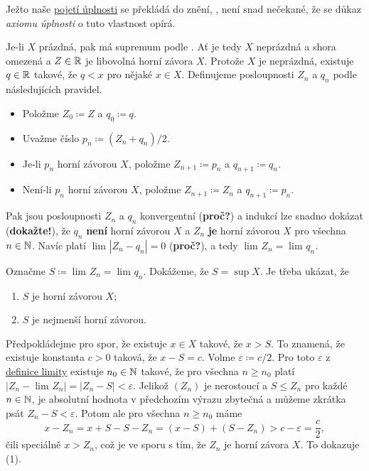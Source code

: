 \begin{propproof}
 Ježto naše \hyperref[cor:r-jsou-uplna]{pojetí úplnosti} se překládá do znění,
 , není snad nečekané, že se důkaz
 \emph{axiomu úplnosti} o tuto vlastnost opírá.

 Je-li $X$ prázdná, pak má supremum podle
 . Ať je tedy $X$ neprázdná a shora
 omezená a $Z \in \mathbb{R}$ je libovolná horní závora $X$. Protože $X$ je neprázdná,
 existuje $q \in \mathbb{R}$ takové, že $q < x$ pro nějaké $x \in X$. Definujeme
 posloupnosti $Z_n$ a $q_n$ podle následujících pravidel.
 \begin{itemize}
  \item Položme $Z_0 \coloneqq Z$ a $q_0 \coloneqq q$.
  \item Uvažme číslo $p_n \coloneqq (Z_n + q_n) / 2$.
  \item Je-li $p_n$ horní závorou $X$, položme $Z_{n+1} \coloneqq p_n$ a
   $q_{n+1} \coloneqq q_n$.
  \item Není-li $p_n$ horní závorou $X$, položme $Z_{n+1} \coloneqq Z_n$ a
   $q_{n+1} \coloneqq p_n$.
 \end{itemize}
 Pak jsou posloupnosti $Z_n$ a $q_n$ konvergentní (\textbf{proč?}) a indukcí lze
 snadno dokázat (\textbf{dokažte!}), že $q_n$ \textbf{není} horní závorou $X$ a
 $Z_n$ \textbf{je} horní závorou $X$ pro všechna $n \in \mathbb{N}$. Navíc platí
 $\lim_{} |Z_n - q_n| = 0$ (\textbf{proč?}), a tedy $\lim_{} Z_n = \lim_{} q_n$.

 Označme $S \coloneqq \lim_{} Z_n = \lim_{} q_n$. Dokážeme, že $S = \sup X$. Je
 třeba ukázat, že
 \begin{enumerate}
  \item $S$ je horní závorou $X$;
  \item $S$ je nejmenší horní závorou.
 \end{enumerate}
 Předpokládejme pro spor, že existuje $x \in X$ takové, že $x > S$. To znamená,
 že existuje konstanta $c > 0$ taková, že $x - S = c$. Volme $\varepsilon
 \coloneqq c / 2$. Pro toto $\varepsilon$ z
 \hyperref[def:limita-posloupnosti]{definice limity} existuje $n_0 \in \mathbb{N}$
 takové, že pro všechna $n \geq n_0$ platí $|Z_n - \lim_{} Z_n| = |Z_n - S| <
 \varepsilon$. Jelikož $(Z_n)$ je nerostoucí a $S \leq Z_n$ pro každé $n \in
 \mathbb{N}$, je absolutní hodnota v předchozím výrazu zbytečná a můžeme zkrátka psát
 $Z_n - S < \varepsilon$. Potom ale pro všechna $n \geq n_0$ máme
 \[
  x - Z_n = x + S - S - Z_n = (x - S) + (S - Z_n) > c - \varepsilon =
  \frac{c}{2},
 \]
 čili speciálně $x > Z_n$, což je ve sporu s tím, že $Z_n$ je horní závora $X$.
 To dokazuje (1).


\end{propproof}
